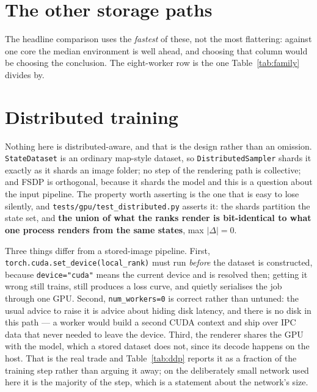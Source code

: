 \documentclass{article}
\begin{document}
\begin{table}[h]
\centering
\caption{A span of recognisable environments and the aggregate over all of
them, at the same operating point. The named rows are chosen to cover the range
rather than to flatter it: the best family, several in the middle, and the ones
that lose to reading.}
\label{tab:threeways}
\vskip 0.06in
\footnotesize
\setlength{\tabcolsep}{3.4pt}

\end{table}



\section{The other storage paths}
\label{app:storage-paths}

The headline comparison uses the \emph{fastest} of these, not the most
flattering: against one core the median environment is well ahead, and choosing
that column would be choosing the conclusion. The eight-worker row is the one
Table~\ref{tab:family} divides by.



\section{Distributed training}
\label{app:ddp}

Nothing here is distributed-aware, and that is the design rather than an
omission. \texttt{StateDataset} is an ordinary map-style dataset, so
\texttt{DistributedSampler} shards it exactly as it shards an image folder; no
step of the rendering path is collective; and FSDP is orthogonal, because it
shards the model and this is a question about the input pipeline. The property
worth asserting is the one that is easy to lose silently, and
\texttt{tests/gpu/test\_distributed.py} asserts it: the shards partition the
state set, and \textbf{the union of what the ranks render is bit-identical to
what one process renders from the same states}, max $|\Delta| = 0$.

Three things differ from a stored-image pipeline. First,
\texttt{torch.cuda.set\_device(local\_rank)} must run \emph{before} the dataset
is constructed, because \texttt{device="cuda"} means the current device and is
resolved then; getting it wrong still trains, still produces a loss curve, and
quietly serialises the job through one GPU. Second, \texttt{num\_workers=0} is
correct rather than untuned: the usual advice to raise it is advice about hiding
disk latency, and there is no disk in this path --- a worker would build a
second CUDA context and ship over IPC data that never needed to leave the
device. Third, the renderer shares the GPU with the model, which a stored
dataset does not, since its decode happens on the host. That is the real trade
and Table~\ref{tab:ddp} reports it as a fraction of the training step rather
than arguing it away; on the deliberately small network used here it is the
majority of the step, which is a statement about the network's size.
\end{document}
